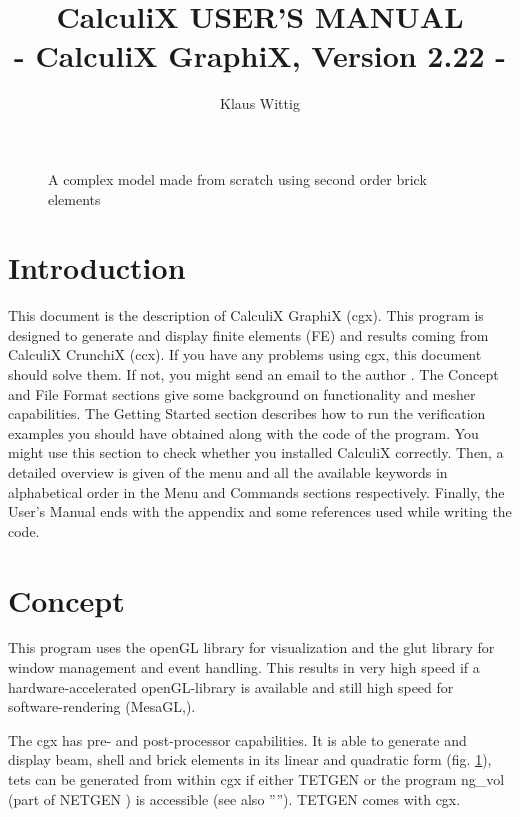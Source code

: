 \documentclass{article}
\begin{document}
\title{CalculiX USER'S MANUAL\\ - CalculiX GraphiX, Version 2.22 -}
\author{Klaus Wittig}
\maketitle
\begin{figure}[h]
\caption{\label{cover} A complex model made from scratch using second order brick elements }
\end{figure}
\newpage


\tableofcontents


\section{Introduction}
 This document is the description of CalculiX GraphiX (cgx). This program is designed to generate and display finite elements (FE) and results coming from CalculiX CrunchiX (ccx). If you have any problems using cgx, this document should solve them. If not, you might send an email to the author \cite{cgx}. The Concept and File Format sections give some background on functionality and mesher capabilities. The Getting Started section describes how to run the verification examples you should have obtained along with the code of the program. You might use this section to check whether you installed CalculiX correctly. Then, a detailed overview is given of the menu and all the available keywords in alphabetical order in the Menu and Commands sections respectively. Finally, the User's Manual ends with the appendix and some references used while writing the code.


\section{Concept}
This program uses the openGL library for visualization and the glut library \cite{glut} for window management and event handling. This results in very high speed if a hardware-accelerated openGL-library is available and still high speed for software-rendering (MesaGL,\cite{mesa}). 

The cgx has pre- and post-processor capabilities. It is able to generate and display beam, shell and brick elements in its linear and quadratic form (fig. \ref{cover}), tets can be generated from within cgx if either TETGEN \cite{TETGEN} or the program ng\_vol (part of NETGEN \cite{NETGEN}) is accessible (see also ''''). TETGEN comes with cgx.
\end{document}

